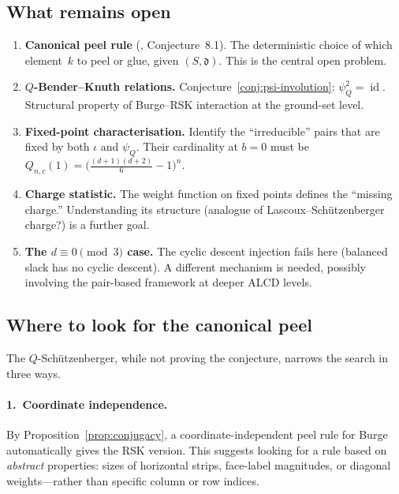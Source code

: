 \documentclass[11pt]{article}
\DeclareMathOperator{\id}{id}
\theoremstyle{plain}
\theoremstyle{definition}
\begin{document}
\subsection{What remains open}

\begin{enumerate}
  \item \textbf{Canonical peel rule}
    (\cite{LOCAL_RULE}, Conjecture~8.1).\;
    The deterministic choice of which element~$k$ to peel or
    glue, given $(S, \mathfrak{d})$.  This is the central open
    problem.

  \item \textbf{$Q$-Bender--Knuth relations.}\;
    Conjecture~\ref{conj:psi-involution}: $\psi_Q^2 = \id$.
    Structural property of Burge--RSK interaction at the
    ground-set level.

  \item \textbf{Fixed-point characterisation.}\;
    Identify the ``irreducible'' pairs that are fixed by both
    $\iota$ and $\psi_Q$.  Their cardinality at $b = 0$ must be
    $Q_{n,c}(1) = \bigl(\frac{(d+1)(d+2)}{6} - 1\bigr)^n$.

  \item \textbf{Charge statistic.}\;
    The weight function on fixed points defines the ``missing
    charge.''  Understanding its structure (analogue of
    Lascoux--Sch\"utzenberger charge?) is a further goal.

  \item \textbf{The $d \equiv 0 \pmod{3}$ case.}\;
    The cyclic descent injection fails here (balanced slack has
    no cyclic descent).  A different mechanism is needed, possibly
    involving the pair-based framework at deeper ALCD levels.
\end{enumerate}


\subsection{Where to look for the canonical peel}

The $Q$-Sch\"utzenberger, while not proving the conjecture,
narrows the search in three ways.

\paragraph{1.\ Coordinate independence.}
By Proposition~\ref{prop:conjugacy}, a coordinate-independent
peel rule for Burge automatically gives the RSK version.  This
suggests looking for a rule based on \emph{abstract} properties:
sizes of horizontal strips, face-label magnitudes, or diagonal
weights---rather than specific column or row indices.
\end{document}
